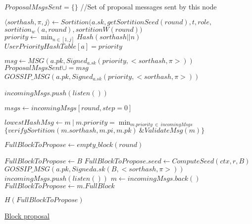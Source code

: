 \documentclass[10pt,a4paper]{article}
\begin{document}
\begin{algorithm}
    \begin{algorithmic}[H]
        \State $ProposalMsgsSent = \{\}$ //Set of proposal messages sent by this node

            \State $\langle sorthash, \pi, j \rangle \gets Sortition(a.sk, getSortitionSeed(round), t, role, $ \newline
            $sortition_w(a, round), sortitionW(round))$
                \State $priority \gets \min_{n \in [1,j]}{Hash(sorthash || n)}$
                \State $UserPriorityHashTable[a] = priority$

                \State $msg \gets MSG(a.pk, Signed_{a.sk}(priority, <sorthash, \pi>))$
                \State $ProposalMsgsSent \cup= msg$
                \State $GOSSIP\_MSG(a.pk, Signed_{a.sk}(priority, <sorthash, \pi>))$
            \EndIf
        \EndFor\

            \State $incomingMsgs.push(listen())$
        \EndWhile\

        \State $msgs \gets incomingMsgs[round, step=0]$


        \State $lowestHashMsg \gets m\ |\ m.priority = \min_{m.priority\ \in\ incomingMsgs}$ \newline
        ${\{verifySortition(m.sorthash, m.pi, m.pk)\ \& ValidateMsg(m)\}}$

        \State $FullBlockToPropose \gets empty\_block(round)$

            \State $FullBlockToPropose \gets B$
            \State $FullBlockToPropose.seed \gets ComputeSeed(ctx, r, B)$
            \State $GOSSIP\_MSG(a.pk, Signed{a.sk}(B, <sorthash, \pi>))$
        \Else
        {
                \State $incomingMsgs.push(listen())$
                \State $m \gets incomingMsgs.back()$
                    \State $FullBlockToPropose \gets m.FullBlock$
                \EndIf
            \EndWhile
        }
        \EndIf

        \Return $H(FullBlockToPropose)$

    \EndFunction
    \end{algorithmic}
    \caption{\underline{Block proposal}}
\end{algorithm}
\end{document}
